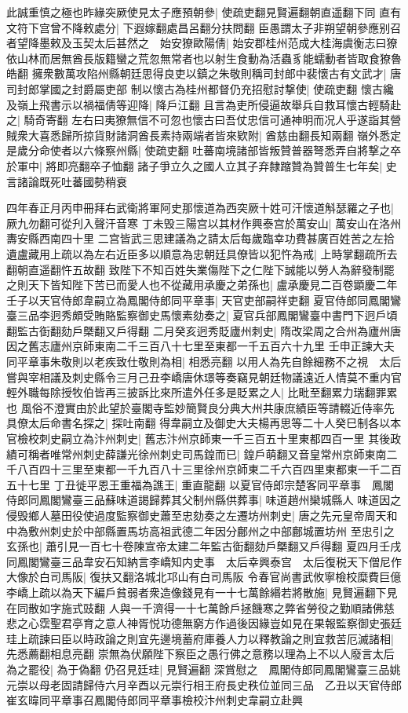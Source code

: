 此誠重慎之極也昨緣突厥使見太子應預朝參|{
	使疏吏翻見賢遍翻朝直遥翻下同}
直有文符下宫曾不降敕處分|{
	下遐嫁翻處昌呂翻分扶問翻}
臣愚謂太子非朔望朝參應别召者望降墨敕及玉契太后甚然之　始安獠歐陽倩|{
	始安郡桂州范成大桂海虞衡志曰獠依山林而居無酋長版籍蠻之荒忽無常者也以射生食動為活蟲豸能蠕動者皆取食獠魯皓翻}
擁衆數萬攻陷州縣朝廷思得良吏以鎮之朱敬則稱司封郎中裴懷古有文武才|{
	唐司封郎掌國之封爵屬吏部}
制以懷古為桂州都督仍充招慰討撃使|{
	使疏吏翻}
懷古纔及嶺上飛書示以禍福倩等迎降|{
	降戶江翻}
且言為吏所侵逼故舉兵自救耳懷古輕騎赴之|{
	騎奇寄翻}
左右曰夷獠無信不可忽也懷古曰吾仗忠信可通神明而况人乎遂詣其營賊衆大喜悉歸所掠貨財諸洞酋長素持兩端者皆來欵附|{
	酋慈由翻長知兩翻}
嶺外悉定是歲分命使者以六條察州縣|{
	使疏吏翻}
吐蕃南境諸部皆叛贊普器弩悉弄自將撃之卒於軍中|{
	將即亮翻卒子恤翻}
諸子爭立久之國人立其子弃隸蹜贊為贊普生七年矣|{
	史言諸論既死吐蕃國勢稍衰}


四年春正月丙申冊拜右武衛將軍阿史那懷道為西突厥十姓可汗懷道斛瑟羅之子也|{
	厥九勿翻可從刋入聲汗音寒}
丁未毁三陽宫以其材作興泰宫於萬安山|{
	萬安山在洛州夀安縣西南四十里}
二宫皆武三思建議為之請太后每歲臨幸功費甚廣百姓苦之左拾遺盧藏用上疏以為左右近臣多以順意為忠朝廷具僚皆以犯忤為戒|{
	上時掌翻疏所去翻朝直遥翻忤五故翻}
致陛下不知百姓失業傷陛下之仁陛下誠能以勞人為辭發制罷之則天下皆知陛下苦已而愛人也不從藏用承慶之弟孫也|{
	盧承慶見二百卷顕慶二年}
壬子以天官侍郎韋嗣立為鳳閣侍郎同平章事|{
	天官吏部嗣祥吏翻}
夏官侍郎同鳳閣鸞臺三品李迥秀頗受賄賂監察御史馬懷素劾奏之|{
	夏官兵部鳳閣鸞臺中書門下迥戶頃翻監古衘翻劾戶槩翻又戶得翻}
二月癸亥迥秀貶廬州刺史|{
	隋改梁周之合州為廬州唐因之舊志廬州京師東南二千三百八十七里至東都一千五百六十九里}
壬申正諫大夫同平章事朱敬則以老疾致仕敬則為相|{
	相悉亮翻}
以用人為先自餘細務不之視　太后嘗與宰相議及刺史縣令三月己丑李嶠唐休璟等奏竊見朝廷物議遠近人情莫不重内官輕外職每除授牧伯皆再三披訴比來所遣外任多是貶累之人|{
	比毗至翻累力瑞翻罪累也}
風俗不澄實由於此望於臺閣寺監妙簡賢良分典大州共康庶績臣等請輟近侍率先具僚太后命書名探之|{
	探吐南翻}
得韋嗣立及御史大夫楊再思等二十人癸巳制各以本官檢校刺史嗣立為汴州刺史|{
	舊志汴州京師東一千三百五十里東都四百一里}
其後政績可稱者唯常州刺史薛謙光徐州刺史司馬鍠而已|{
	鍠戶萌翻又音皇常州京師東南二千八百四十三里至東都一千九百八十三里徐州京師東二千六百四里東都東一千二百五十七里}
丁丑徙平恩王重福為譙王|{
	重直龍翻}
以夏官侍郎宗楚客同平章事　鳳閣侍郎同鳳閣鸞臺三品蘇味道謁歸葬其父制州縣供葬事|{
	味道趙州欒城縣人}
味道因之侵毁鄉人墓田役使過度監察御史蕭至忠劾奏之左遷坊州刺史|{
	唐之先元皇帝周天和中為敷州刺史於中部縣置馬坊高祖武德二年因分鄜州之中部鄜城置坊州}
至忠引之玄孫也|{
	蕭引見一百七十卷陳宣帝太建二年監古衘翻劾戶槩翻又戶得翻}
夏四月壬戌同鳳閣鸞臺三品韋安石知納言李嶠知内史事　太后幸興泰宫　太后復税天下僧尼作大像於白司馬阪|{
	復扶又翻洛城北邛山有白司馬阪}
令春官尚書武攸寧檢校糜費巨億李嶠上疏以為天下編戶貧弱者衆造像錢見有一十七萬餘緡若將散施|{
	見賢遍翻下見在同散如字施式豉翻}
人與一千濟得一十七萬餘戶拯饑寒之弊省勞役之勤順諸佛慈悲之心霑聖君亭育之意人神胥悦功德無窮方作過後因緣豈如見在果報監察御史張廷珪上疏諫曰臣以時政論之則宜先邊境蓄府庫養人力以釋教論之則宜救苦厄滅諸相|{
	先悉薦翻相息亮翻}
崇無為伏願陛下察臣之愚行佛之意務以理為上不以人廢言太后為之罷役|{
	為于偽翻}
仍召見廷珪|{
	見賢遍翻}
深賞慰之　鳳閣侍郎同鳳閣鸞臺三品姚元崇以母老固請歸侍六月辛酉以元崇行相王府長史秩位並同三品　乙丑以天官侍郎崔玄暐同平章事召鳳閣侍郎同平章事檢校汴州刺史韋嗣立赴興

